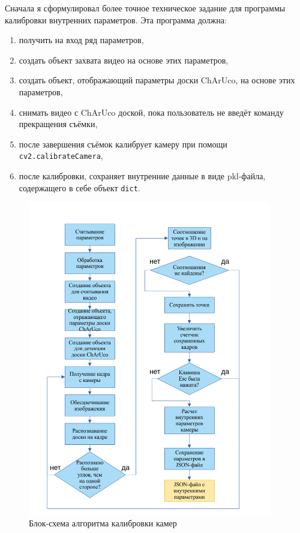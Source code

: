 \documentclass[14pt, a4paper]{extarticle}
\begin{document}
Сначала я сформулировал более точное техническое задание для программы калибровки внутренних параметров. 
Эта программа должна:
\begin{enumerate}
  \item получить на вход ряд параметров,
  \item создать объект захвата видео на основе этих параметров,
  \item создать объект, отображающий параметры доски ChArUco, на основе этих параметров,
  \item снимать видео с ChArUco доской, пока пользователь не введёт команду прекращения съёмки,
  \item после завершения съёмок калибрует камеру при помощи \\\texttt{cv2.calibrateCamera},
  \item после калибровки, сохраняет внутренние данные в виде pkl-файла, содержащего в себе объект \texttt{dict}.
\end{enumerate}

\begin{figure}[h!]
  \begin{center}
    \includegraphics[width=0.95\textwidth]{images/block-schemes/intrinsics_scheme.png}
  \end{center}
  \caption{Блок-схема алгоритма калибровки камер}
  \label{fig:intrinsincs_block_scheme}
\end{figure}
\end{document}
